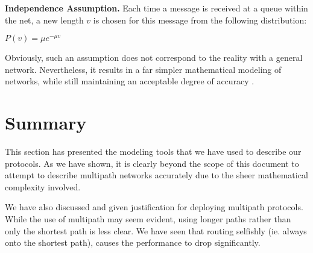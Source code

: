 \begin{theorem}
\label{th:indep}
\textbf{Independence Assumption.} Each time a message is received at a queue within the net, a new length $v$ is chosen for this message from the following distribution:

\begin{center}
 $P(v) = \mu e^{-\mu v}$
\end{center} 
\end{theorem}

Obviously, such an assumption does not correspond to the reality with a general network. Nevertheless, it results in a far simpler mathematical modeling of networks, while still maintaining an acceptable degree of accuracy \cite{CommNets}. 


\section{Summary}

This section has presented the modeling tools that we have used to describe our protocols. As we have shown, it is clearly beyond the scope of this document to attempt to describe multipath networks accurately due to the sheer mathematical complexity involved. 

We have also discussed and given justification for deploying multipath protocols. While the use of multipath may seem evident, using longer paths rather than only the shortest path is less clear. We have seen that routing selfishly (ie. always onto the shortest path), causes the performance to drop significantly.

